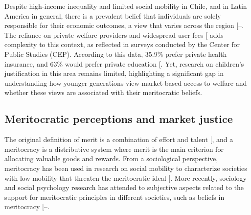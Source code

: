 \documentclass[
  12pt,
  letterpaper,
]{article}
\begin{document}
Despite high-income inequality and limited social mobility in Chile, and
in Latin America in general, there is a prevalent belief that
individuals are solely responsible for their economic outcomes, a view
that varies across the region
{[}--\citeproc{ref-salgado_inequality_2023}{45}{]}.
The reliance on private welfare providers and widespread user fees
{[}\citeproc{ref-molyneux_neoliberal_2008}{46}{]} adds complexity to
this context, as reflected in surveys conducted by the Center for Public
Studies (CEP). According to this data, 35.9\% prefer private health
insurance, and 63\% would prefer private education
{[}\citeproc{ref-centrodeestudiospublicos_estudio_2024}{47}{]}. Yet,
research on children's justification in this area remains limited,
highlighting a significant gap in understanding how younger generations
view market-based access to welfare and whether these views are
associated with their meritocratic beliefs.

\subsection{Meritocratic perceptions and market
justice}\label{meritocratic-perceptions-and-market-justice}

The original definition of merit is a combination of effort and talent
{[}\citeproc{ref-young_rise_1958}{5}{]}, and a meritocracy is a
distributive system where merit is the main criterion for allocating
valuable goods and rewards. From a sociological perspective, meritocracy
has been used in research on social mobility to characterize societies
with low mobility that threaten the meritocratic ideal
{[}\citeproc{ref-goldthorpe_myth_2003}{48}{]}. More recently, sociology
and social psychology research has attended to subjective aspects
related to the support for meritocratic principles in different
societies, such as beliefs in meritocracy
{[}--\citeproc{ref-mijs_paradox_2019}{51}{]}.
\end{document}
